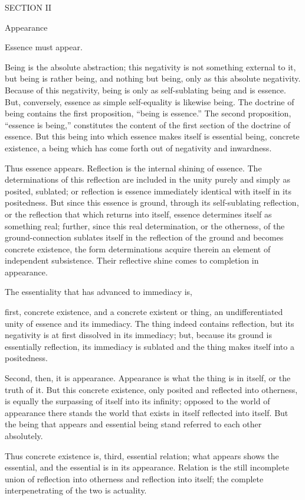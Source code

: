 SECTION II

Appearance

Essence must appear.

Being is the absolute abstraction;
this negativity is not something external to it,
but being is rather being,
and nothing but being,
only as this absolute negativity.
Because of this negativity,
being is only as self-sublating being
and is essence.
But, conversely,
essence as simple self-equality
is likewise being.
The doctrine of being contains
the first proposition, “being is essence.”
The second proposition, “essence is being,”
constitutes the content of the first section
of the doctrine of essence.
But this being into which
essence makes itself
is essential being,
concrete existence,
a being which has come forth
out of negativity and inwardness.

Thus essence appears.
Reflection is the internal shining of essence.
The determinations of this reflection are included
in the unity purely and simply as posited, sublated;
or reflection is essence immediately
identical with itself in its positedness.
But since this essence is ground,
through its self-sublating reflection,
or the reflection that which returns into itself,
essence determines itself as something real;
further, since this real determination, or the otherness,
of the ground-connection sublates itself
in the reflection of the ground
and becomes concrete existence,
the form determinations acquire therein
an element of independent subsistence.
Their reflective shine comes to completion in appearance.

The essentiality that has advanced to immediacy is,

first, concrete existence,
and a concrete existent or thing,
an undifferentiated unity of
essence and its immediacy.
The thing indeed contains reflection,
but its negativity is at first
dissolved in its immediacy;
but, because its ground is
essentially reflection,
its immediacy is sublated
and the thing makes itself
into a positedness.

Second, then, it is appearance.
Appearance is what the thing is in itself,
or the truth of it.
But this concrete existence,
only posited and reflected into otherness,
is equally the surpassing of itself into its infinity;
opposed to the world of appearance
there stands the world that exists
in itself reflected into itself.
But the being that appears and essential being
stand referred to each other absolutely.

Thus concrete existence is, third, essential relation;
what appears shows the essential,
and the essential is in its appearance.
Relation is the still incomplete union of
reflection into otherness and reflection into itself;
the complete interpenetrating of the two is actuality.

